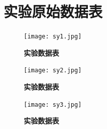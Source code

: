 \documentclass[UTF8]{article}
\theoremstyle{MyLineTheoremStyle} %
\theoremstyle{MyBlockTheoremStyle} %
\theoremstyle{MySubsubsectionStyle} %
\begin{document}
\section{实验原始数据表}

\begin{figure}[H]
    \centering
    \texttt{[image: sy1.jpg]}
    \caption{\bfseries 实验数据表}
\end{figure}

\begin{figure}[H]
    \centering
    \texttt{[image: sy2.jpg]}
    \caption{\bfseries 实验数据表}
\end{figure}

\begin{figure}[H]
    \centering
    \texttt{[image: sy3.jpg]}
    \caption{\bfseries 实验数据表}
\end{figure}
\end{document}
